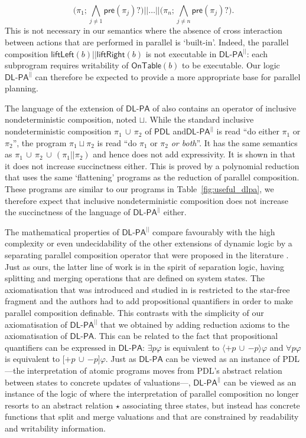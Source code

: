 \documentclass{llncs}
\newcommand{\pll}{ {||} }							%
\newcommand{\Dlpa}{\ensuremath{\mathsf{DL\text{-}PA}}\xspace}
\newcommand{\DlpaPll}{\ensuremath{\mathsf{DL\text{-}PA}^\pll}\xspace}
\newcommand{\Pdl}{\ensuremath{\mathsf{PDL}}\xspace}
\newcommand{\assgntopV}[1]{{\mathtt {+} #1}}
\newcommand{\assgnbotV}[1]{{\mathtt {-} #1}}
\newcommand{\lbox}[1]{ \big[ #1 \big] }
\newcommand{\ldia}[1]{ \big\langle #1 \big\rangle}
\newcommand{\ndet}{\,{\cup}\,}
\renewcommand{\phi}{\varphi}
\begin{document}
$$ \big( \pi_1 ; \bigwedge_{j \neq 1} \mathsf{pre}(\pi_j) ? \big) \pll \ldots \pll 
   \big( \pi_n ; \bigwedge_{j \neq n} \mathsf{pre}(\pi_j) ? \big) . $$
This is not necessary in our semantics where the absence of cross interaction between actions that are performed in parallel is `built-in'. 
Indeed, the parallel composition 
$\mathsf{liftLeft}(b) \pll \mathsf{liftRight}(b)$ 
is not executable in \DlpaPll: each subprogram requires writability of $\mathsf{OnTable}(b)$ to be executable. 
Our logic \DlpaPll can therefore be expected to provide a more appropriate base for parallel planning. 

The language of the extension of \Dlpa of \cite{HerzigEtal-Ijcai19} also contains an operator of inclusive nondeterministic composition, noted $\sqcup$. 
While the standard inclusive nondeterministic composition $\pi_1 \ndet \pi_2$ of \Pdl and\DlpaPll is read 
``do either $\pi_1$ or $\pi_2$'', the program $\pi_1 \sqcup \pi_2$ is read 
``do $\pi_1$ or $\pi_2$ \emph{or both}''. 
It has the same semantics as $\pi_1 \ndet \pi_2 \ndet (\pi_1 \pll \pi_2)$ and hence does not add expressivity. 
It is shown in \cite{HerzigEtal-Ijcai19} that it does not increase succinctness either.
This is proved by a polynomial reduction that uses the same `flattening' programs as the reduction of parallel composition. 
These programs are similar to our programs in Table~\ref{fig:useful_dlpa}, we therefore expect that inclusive nondeterministic composition does not increase the succinctness of the language of \DlpaPll either. 

The mathematical properties of \DlpaPll compare favourably with 
the high complexity or even undecidability of the 
other extensions of dynamic logic by a separating parallel composition operator that were proposed in the literature
\cite{BalbianiT14,Boudou16}.
Just as ours, the latter line of work is in the spirit of separation logic, having splitting and merging operations that are defined on system states. 
The axiomatisation that was introduced and studied in \cite{DBLP:journals/logcom/BalbianiB18} is restricted to the star-free fragment and the authors had to add propositional quantifiers in order to make parallel composition definable. 
This contrasts with the simplicity of our axiomatisation of \DlpaPll that we obtained by adding reduction axioms to the axiomatisation of \Dlpa. 
This can be related to the fact that propositional quantifiers can be expressed in \Dlpa: 
$\exists p \phi$ is equivalent to $\ldia{ \assgntopV p \ndet \assgnbotV p } \phi$ and 
$\forall p \phi$ is equivalent to $\lbox{ \assgntopV p \ndet \assgnbotV p } \phi$.
Just as \Dlpa can be viewed as an instance of PDL%
---the interpretation of atomic programs moves from PDL's abstract relation between states to concrete updates of valuations\mbox{---,}
\DlpaPll can be viewed as an instance of the logic of \cite{DBLP:journals/entcs/BenevidesFV11}
where the interpretation of parallel composition no longer resorts to
an abstract relation $\star$ associating three states, 
but instead has concrete functions that split and merge valuations and that are constrained by readability and writability information. 
\end{document}
